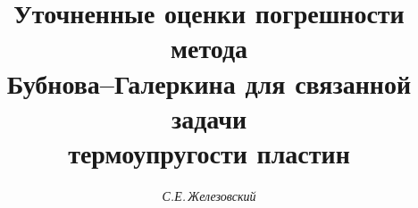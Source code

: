 









\newcommand{\tts}[1]{}










\setcounter{page}{75}












\author{\it С.Е.\,Железовский}




\title{Уточненные оценки погрешности метода\\


Бубнова--Галеркина для связанной задачи\\


термоупругости пластин}









\date{}







\pagestyle{plain} %








